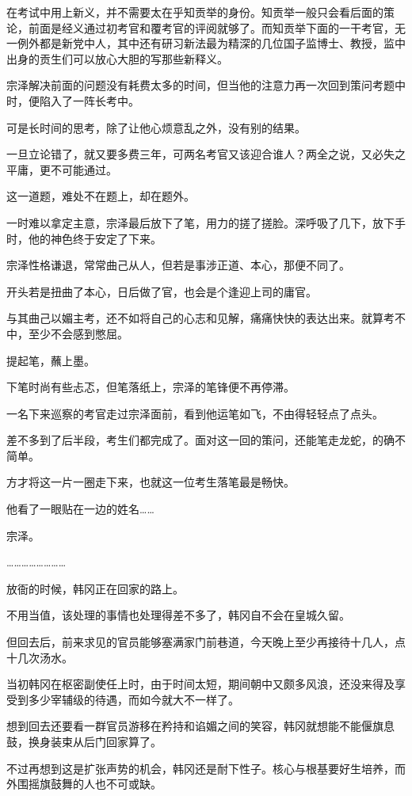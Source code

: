 在考试中用上新义，并不需要太在乎知贡举的身份。知贡举一般只会看后面的策论，前面是经义通过初考官和覆考官的评阅就够了。而知贡举下面的一干考官，无一例外都是新党中人，其中还有研习新法最为精深的几位国子监博士、教授，监中出身的贡生们可以放心大胆的写那些新释义。

宗泽解决前面的问题没有耗费太多的时间，但当他的注意力再一次回到策问考题中时，便陷入了一阵长考中。

可是长时间的思考，除了让他心烦意乱之外，没有别的结果。

一旦立论错了，就又要多费三年，可两名考官又该迎合谁人？两全之说，又必失之平庸，更不可能通过。

这一道题，难处不在题上，却在题外。

一时难以拿定主意，宗泽最后放下了笔，用力的搓了搓脸。深呼吸了几下，放下手时，他的神色终于安定了下来。

宗泽性格谦退，常常曲己从人，但若是事涉正道、本心，那便不同了。

开头若是扭曲了本心，日后做了官，也会是个逢迎上司的庸官。

与其曲己以媚主考，还不如将自己的心志和见解，痛痛快快的表达出来。就算考不中，至少不会感到憋屈。

提起笔，蘸上墨。

下笔时尚有些忐忑，但笔落纸上，宗泽的笔锋便不再停滞。

一名下来巡察的考官走过宗泽面前，看到他运笔如飞，不由得轻轻点了点头。

差不多到了后半段，考生们都完成了。面对这一回的策问，还能笔走龙蛇，的确不简单。

方才将这一片一圈走下来，也就这一位考生落笔最是畅快。

他看了一眼贴在一边的姓名……

宗泽。

……………………

放衙的时候，韩冈正在回家的路上。

不用当值，该处理的事情也处理得差不多了，韩冈自不会在皇城久留。

但回去后，前来求见的官员能够塞满家门前巷道，今天晚上至少再接待十几人，点十几次汤水。

当初韩冈在枢密副使任上时，由于时间太短，期间朝中又颇多风浪，还没来得及享受到多少宰辅级的待遇，而如今就大不一样了。

想到回去还要看一群官员游移在矜持和谄媚之间的笑容，韩冈就想能不能偃旗息鼓，换身装束从后门回家算了。

不过再想到这是扩张声势的机会，韩冈还是耐下性子。核心与根基要好生培养，而外围摇旗鼓舞的人也不可或缺。

